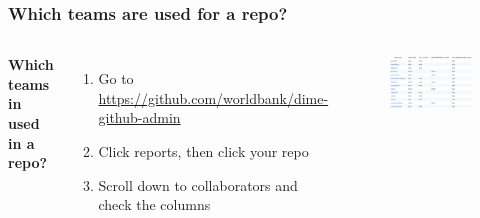 \documentclass[aspectratio=169]{beamer} %
\begin{document}
\begin{frame}
	\frametitle{Which teams are used for a repo?}
	\begin{columns}[c]
		\textbf{Which teams in used in a repo?}
		\begin{enumerate}
			\item Go to \url{https://github.com/worldbank/dime-github-admin}
			\item Click reports, then click your repo
			\item Scroll down to collaborators and check the columns
		\end{enumerate}
		
		\begin{figure}
			\centering
			\includegraphics[width=1\linewidth]{./img/which-teams-in-repo}
		\end{figure}
	\end{columns}		
\end{frame}





\end{document}
